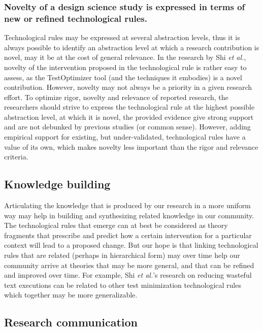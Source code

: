 \documentclass[graybox]{svmult}
\begin{document}
\subsubsection{Novelty of a design science study is expressed in terms of new or refined technological rules.} Technological rules may be expressed at several abstraction levels, thus it is always possible to identify an abstraction level at which a research contribution is novel, may it be at the cost of general relevance.  In the research by Shi \emph{et al.}, novelty of the intervention proposed in the technological rule is rather easy to assess, as the TestOptimizer tool (and the techniques it embodies) is a novel contribution.  
However, novelty may not always be a priority in a given research effort.
To optimize rigor, novelty and relevance of reported research, the researchers should strive to express the technological rule at the highest possible abstraction level, at which it is novel, the provided evidence give strong support and are not debunked by previous studies (or common sense). However, adding empirical support for existing, but under-validated, technological rules have a value of its own, which makes novelty less important than the rigor and relevance criteria.


\subsection{Knowledge building}
\label{sec:knowledge}

Articulating the knowledge that is produced by our research in a more uniform way may help in building and synthesizing related knowledge in our community. 
The technological rules that emerge can at best be considered as theory fragments that prescribe and predict how a certain intervention for a particular context will lead to a proposed change. 
But our hope is that linking technological rules that are related (perhaps in hierarchical form) may over time help our community arrive at theories that may be more general, and that can be refined and improved over time. 
For example, Shi \emph{et al.}'s research on reducing wasteful text executions can be related to other test minimization technological rules which together may be more generalizable. 

\subsection{Research communication}
\label{sec:communication}
\end{document}
